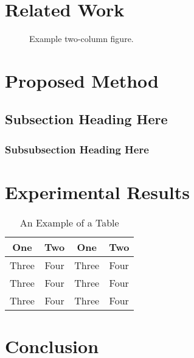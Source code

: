 \documentclass[10pt,journal,compsoc]{IEEEtran}
\begin{document}
\section{Related Work}
\lipsum[5-6]

\begin{figure*}[!t]
\centering
{}
\caption{Example two-column figure.}
\end{figure*}

\section{Proposed Method}
\lipsum[7]

\subsection{Subsection Heading Here}
\lipsum[8-9]

\subsubsection{Subsubsection Heading Here}
\lipsum[10-12]


\section{Experimental Results}

\lipsum[13-17]

\begin{table}[!t]
\renewcommand{\arraystretch}{1.3}
\caption{An Example of a Table}
\centering
\begin{tabular}{c||c|c|c}
\hline
One & Two & One & Two\\
\hline\hline
Three & Four &Three & Four\\
\hline
Three & Four &Three & Four\\
\hline
Three & Four &Three & Four\\
\hline
\end{tabular}
\end{table}


\section{Conclusion}
\lipsum[18]
\end{document}
